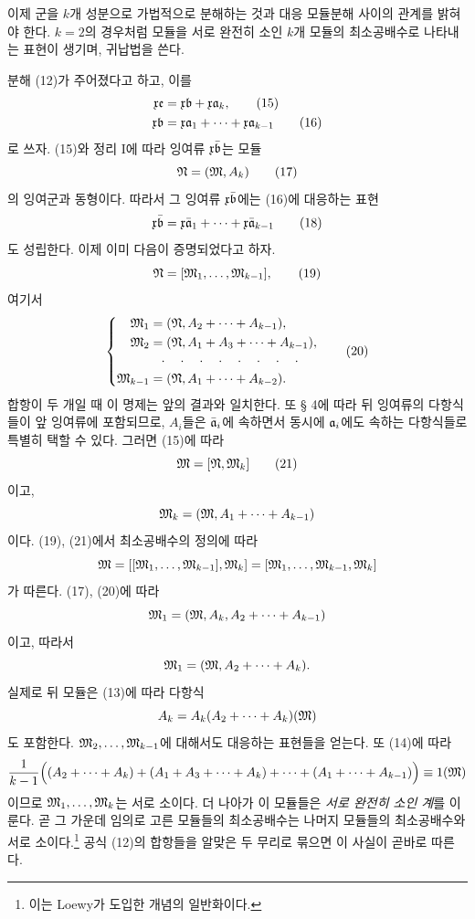 이제 군을 \(k\)개 성분으로 가법적으로 분해하는 것과 대응 모듈분해 사이의 관계를 밝혀야 한다. \(k=2\)의 경우처럼 모듈을 서로 완전히 소인 \(k\)개 모듈의 최소공배수로 나타내는 표현이 생기며, 귀납법을 쓴다.

분해 (12)가 주어졌다고 하고, 이를
\begin{align}
 \mathfrak x\mathfrak e&=\mathfrak x\mathfrak{b}+\mathfrak x\mathfrak{a}_k,\tag{15}\\
 \mathfrak x\mathfrak{b}&=\mathfrak x\mathfrak{a}_1+\cdots+\mathfrak x\mathfrak{a}_{k-1}\tag{16}
\end{align}
로 쓰자. (15)와 정리 I에 따라 잉여류 \(\mathfrak x\bar{\mathfrak{b}}\)는 모듈
\begin{equation}
 \mathfrak N=(\mathfrak M,A_k)
\tag{17}
\end{equation}
의 잉여군과 동형이다. 따라서 그 잉여류 \(\mathfrak x\bar{\mathfrak{b}}\)에는 (16)에 대응하는 표현
\begin{equation}
 \mathfrak x\bar{\mathfrak{b}}=\mathfrak x\bar{\mathfrak{a}}_1+\cdots+\mathfrak x\bar{\mathfrak{a}}_{k-1}
\tag{18}
\end{equation}
도 성립한다. 이제 이미 다음이 증명되었다고 하자.
\begin{equation}
 \mathfrak N=[\mathfrak M_1,\ldots,\mathfrak M_{k-1}],
\tag{19}
\end{equation}
여기서
\begin{equation}
\left\{
\begin{aligned}
 \mathfrak M_1&=(\mathfrak N,A_2+\cdots+A_{k-1}),\\
 \mathfrak M_2&=(\mathfrak N,A_1+A_3+\cdots+A_{k-1}),\\[-0.2ex]
 &\hspace{0.25cm}\cdot\quad\cdot\quad\cdot\quad\cdot\quad\cdot\quad\cdot\quad\cdot\quad\cdot\\[-0.2ex]
 \mathfrak M_{k-1}&=(\mathfrak N,A_1+\cdots+A_{k-2}).
\end{aligned}\right.
\tag{20}
\end{equation}
합항이 두 개일 때 이 명제는 앞의 결과와 일치한다. 또 § 4에 따라 뒤 잉여류의 다항식들이 앞 잉여류에 포함되므로, \(A_i\)들은 \(\bar{\mathfrak{a}}_i\)에 속하면서 동시에 \(\mathfrak{a}_i\)에도 속하는 다항식들로 특별히 택할 수 있다. 그러면 (15)에 따라
\begin{equation}
 \mathfrak M=[\mathfrak N,\mathfrak M_k]
\tag{21}
\end{equation}
이고,
\[
 \mathfrak M_k=(\mathfrak M,A_1+\cdots+A_{k-1})
\]
이다. (19), (21)에서 최소공배수의 정의에 따라
\[
 \mathfrak M=[[\mathfrak M_1,\ldots,\mathfrak M_{k-1}],\mathfrak M_k]
     =[\mathfrak M_1,\ldots,\mathfrak M_{k-1},\mathfrak M_k]
\]
가 따른다. (17), (20)에 따라
\[
 \mathfrak M_1=(\mathfrak M,A_k,A_2+\cdots+A_{k-1})
\]
이고, 따라서
\[
 \mathfrak M_1=(\mathfrak M,A_2+\cdots+A_k).
\]
실제로 뒤 모듈은 (13)에 따라 다항식
\[
 A_k=A_k(A_2+\cdots+A_k)(\mathfrak M)
\]
도 포함한다. \(\mathfrak M_2,\ldots,\mathfrak M_{k-1}\)에 대해서도 대응하는 표현들을 얻는다. 또 (14)에 따라
\[
 \frac{1}{k-1}\Bigl((A_2+\cdots+A_k)
 +(A_1+A_3+\cdots+A_k)+\cdots+(A_1+\cdots+A_{k-1})\Bigr)
 \equiv1(\mathfrak M)
\]
이므로 \(\mathfrak M_1,\ldots,\mathfrak M_k\)는 서로 소이다. 더 나아가 이 모듈들은 \emph{서로 완전히 소인 계}를 이룬다. 곧 그 가운데 임의로 고른 모듈들의 최소공배수는 나머지 모듈들의 최소공배수와 서로 소이다.\footnote{이는 Loewy가 도입한 개념의 일반화이다.} 공식 (12)의 합항들을 알맞은 두 무리로 묶으면 이 사실이 곧바로 따른다.

